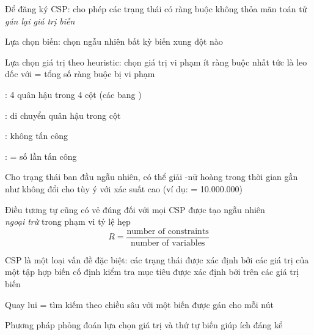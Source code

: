 \documentclass{article}
\begin{document}
\begin{huge}
Để đăng ký CSP:\al
cho phép các trạng thái có ràng buộc không thỏa mãn\al
toán tử \emph{gán lại giá trị biến }

Lựa chọn biến: chọn ngẫu nhiên bất kỳ biến xung đột nào

Lựa chọn giá trị theo  heuristic:\al
chọn giá trị vi phạm ít ràng buộc nhất \al
tức là leo dốc với  = tổng số ràng buộc bị vi phạm



: 4 quân hậu trong 4 cột (các bang )

: di chuyển quân hậu trong cột

: không tấn công

:  = số lần tấn công

\vspace*{0.3in}

\textwidth
{}


Cho trạng thái ban đầu ngẫu nhiên, có thể giải -nữ hoàng trong thời gian gần như không đổi cho
tùy ý  với xác suất cao (ví dụ:  = 10.000.000)

Điều tương tự cũng có vẻ đúng đối với mọi CSP được tạo ngẫu nhiên \\
\emph{ngoại trừ} trong phạm vi tỷ lệ hẹp
\[
R = \frac{\mbox{number of constraints}}{\mbox{number of variables}}
\]

\vspace*{0.2in}

\textwidth
{}






CSP là một loại vấn đề đặc biệt:\al
các trạng thái được xác định bởi các giá trị của một tập hợp biến cố định\al
kiểm tra mục tiêu được xác định bởi  trên các giá trị biến

Quay lui = tìm kiếm theo chiều sâu với một biến được gán cho mỗi nút

Phương pháp phỏng đoán lựa chọn giá trị và thứ tự biến giúp ích đáng kể


\end{huge}
\end{document}
